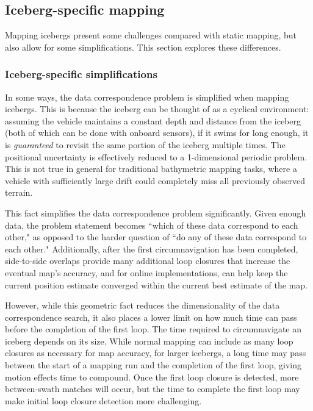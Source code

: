 \subsection{Iceberg-specific mapping}

Mapping icebergs present some challenges compared with static mapping, but also allow for some simplifications. This section explores these differences.

\subsubsection{Iceberg-specific simplifications}

In some ways, the data correspondence problem is simplified when mapping icebergs. This is because the iceberg can be thought of as a cyclical environment: assuming the vehicle maintains a constant depth and distance from the iceberg (both of which can be done with onboard sensors), if it swims for long enough, it is \emph{guaranteed} to revisit the same portion of the iceberg multiple times. The positional uncertainty is effectively reduced to a 1-dimensional periodic problem. This is not true in general for traditional bathymetric mapping tasks, where a vehicle with sufficiently large drift could completely miss all previously observed terrain. 

This fact simplifies the data correspondence problem significantly. Given enough data, the problem statement becomes ``which of these data correspond to each other," as opposed to the harder question of ``do any of these data correspond to each other." Additionally, after the first circumnavigation has been completed, side-to-side overlaps provide many additional loop closures that increase the eventual map's accuracy, and for online implementations, can help keep the current position estimate converged within the current best estimate of the map.


However, while this geometric fact reduces the dimensionality of the data correspondence search, it also places a lower limit on how much time can pass before the completion of the first loop. The time required to circumnavigate an iceberg depends on its size. While normal mapping can include as many loop closures as necessary for map accuracy, for larger icebergs, a long time may pass between the start of a mapping run and the completion of the first loop, giving motion effects time to compound. Once the first loop closure is detected, more between-swath matches will occur, but the time to complete the first loop may make initial loop closure detection more challenging.

